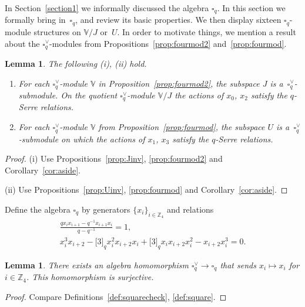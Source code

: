 \documentclass[11pt]{article}
\numberwithin{equation}{section}
\numberwithin{equation}{section}
\newtheorem{Lemma}[Theorem]{Lemma}
\begin{document}
{In Section~\ref{section1} we informally discussed the algebra $\square_q$. In this section we formally bring in~$\square_q$, and review its basic properties. We then display sixteen $\square_q$-module structures on $\mathbb V/J$ or~$U$. In order to motivate things, we mention a result about the $\square^\vee_q$-modules from Propositions~\ref{prop:fourmod2} and~\ref{prop:fourmod}.

\begin{Lemma}\label{lem:alwaysUmod}
The following {\rm (i)}, {\rm (ii)} hold.
\begin{enumerate}\itemsep=0pt
\item[\rm (i)] For each $\square^\vee_q$-module $\mathbb V$ in Proposition~{\rm \ref{prop:fourmod2}},
 the subspace $J$ is a~$\square^\vee_q$-submodule. On the quotient $\square^\vee_q$-module $\mathbb V/J$
the actions of $x_0$, $x_2$ satisfy the $q$-Serre relations.
\item[\rm (ii)] For each $\square^\vee_q$-module $\mathbb V$ from Proposition~{\rm \ref{prop:fourmod}},
 the subspace $U$ is a~$\square^\vee_q$-submodule on which the actions of $x_1$, $x_3$ satisfy the $q$-Serre relations.
\end{enumerate}
\end{Lemma}
\begin{proof} (i) Use Propositions~\ref{prop:Jinv}, \ref{prop:fourmod2} and Corollary~\ref{cor:aside}.

 (ii) Use Propositions~\ref{prop:Uinv}, \ref{prop:fourmod} and Corollary~\ref{cor:aside}.
\end{proof}

\begin{Definition}\label{def:square} Define the algebra $\square_q$ by generators $\lbrace x_i \rbrace_{i \in \mathbb Z_4}$ and relations
\begin{gather*}
\frac{q x_i x_{i+1}-q^{-1}x_{i+1}x_i}{q-q^{-1}} = 1,\\ %
x^3_i x_{i+2} - \lbrack 3 \rbrack_q x^2_i x_{i+2} x_i +\lbrack 3 \rbrack_q x_i x_{i+2} x^2_i -x_{i+2} x^3_i = 0.%
\end{gather*}
\end{Definition}

\begin{Lemma}\label{lem:add}There exists an algebra homomorphism $\square^\vee_q \to \square_q$ that sends
$x_i \mapsto x_i$ for $i \in {\mathbb Z}_4$. This homomorphism is surjective.
\end{Lemma}
\begin{proof} Compare Definitions~\ref{def:squarecheck}, \ref{def:square}.
\end{proof}

}
\end{document}
